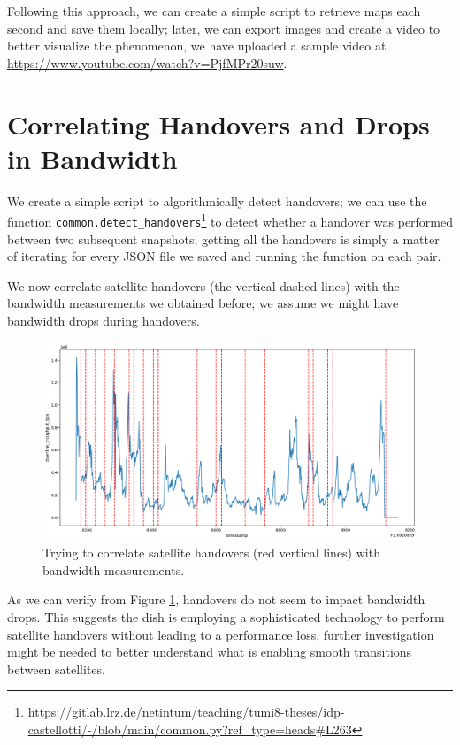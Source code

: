 \documentclass[IN,11pt,twoside,openright,idp,english]{tumthesis}
\begin{document}
Following this approach, we can create a simple script to retrieve maps each second and save them locally; later, we can
export images and create a video to better visualize the phenomenon, we have uploaded a sample video at
\url{https://www.youtube.com/watch?v=PjfMPr20suw}.

\section{Correlating Handovers and Drops in Bandwidth}
\label{sec:sat-hand-drop}

We create a simple script to algorithmically detect handovers; we can use the function
\texttt{common.detect\_handovers}\footnote{\url{https://gitlab.lrz.de/netintum/teaching/tumi8-theses/idp-castellotti/-/blob/main/common.py?ref_type=heads\#L263}}
to detect whether a handover was performed between two subsequent snapshots; getting all the handovers is simply a
matter of iterating for every JSON file we saved and running the function on each pair.

We now correlate satellite handovers (the vertical dashed lines) with the bandwidth measurements we obtained before; we
assume we might have bandwidth drops during handovers. 

\begin{figure}
    \centering
    \includegraphics[width=1\columnwidth]{img/correlation_handovers_bw.png}
    \caption{Trying to correlate satellite handovers (red vertical lines) with bandwidth measurements.}
    \label{fig:vis-correlation-handovers}
\end{figure}

As we can verify from Figure \ref{fig:vis-correlation-handovers}, handovers do not seem to impact bandwidth drops. This
suggests the dish is employing a sophisticated technology to perform satellite handovers without leading to a
performance loss, further investigation might be needed to better understand what is enabling smooth transitions between
satellites.
\end{document}
